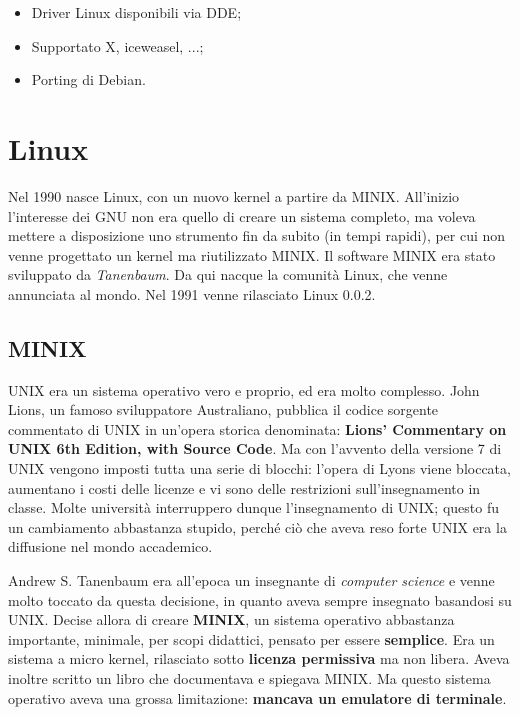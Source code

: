 \begin{itemize}
	
	\item Driver Linux disponibili via DDE;
	\item Supportato X, iceweasel, ...;
	\item Porting di Debian.
	
\end{itemize} 

\section{Linux}

Nel 1990 nasce Linux, con un nuovo kernel a partire da MINIX. All'inizio l'interesse dei GNU non era quello di creare un sistema completo, ma voleva mettere a disposizione uno strumento fin da subito (in tempi rapidi), per cui non venne progettato un kernel ma riutilizzato MINIX. Il software MINIX era stato sviluppato da \textit{Tanenbaum}. Da qui nacque la comunità Linux, che venne annunciata al mondo. Nel 1991 venne rilasciato Linux 0.0.2.

\subsection{MINIX}

UNIX era un sistema operativo vero e proprio, ed era molto complesso. John Lions, un famoso sviluppatore Australiano, pubblica il codice sorgente commentato di UNIX in un'opera storica denominata: \textbf{Lions' Commentary on UNIX 6th Edition, with Source Code}. Ma con l'avvento della versione 7 di UNIX vengono imposti tutta una serie di blocchi: l'opera di Lyons viene bloccata, aumentano i costi delle licenze e vi sono delle restrizioni sull'insegnamento in classe. Molte università interruppero dunque l'insegnamento di UNIX; questo fu un cambiamento abbastanza stupido, perché ciò che aveva reso forte UNIX era la diffusione nel mondo accademico. 

Andrew S. Tanenbaum era all'epoca un insegnante di \textit{computer science} e venne molto toccato da questa decisione, in quanto aveva sempre insegnato basandosi su UNIX. Decise allora di creare \textbf{MINIX}, un sistema operativo abbastanza importante, minimale, per scopi didattici, pensato per essere \textbf{semplice}. Era un sistema a micro kernel, rilasciato sotto \textbf{licenza permissiva} ma non libera. Aveva inoltre scritto un libro che documentava e spiegava MINIX. Ma questo sistema operativo aveva una grossa limitazione: \textbf{mancava un emulatore di terminale}.

